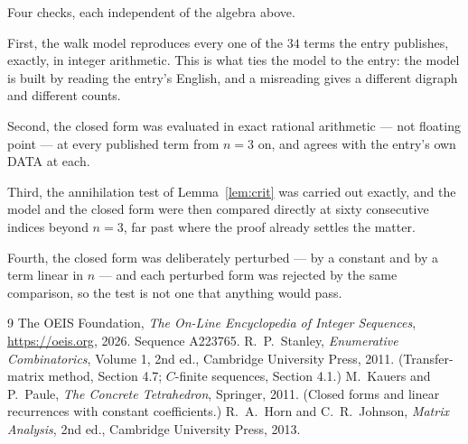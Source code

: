\documentclass[11pt,a4paper]{article}
\theoremstyle{plain}
\theoremstyle{definition}
\begin{document}
Four checks, each independent of the algebra above.

First, the walk model reproduces every one of the $34$ terms the entry publishes,
exactly, in integer arithmetic. This is what ties the model to the entry: the model is built
by reading the entry's English, and a misreading gives a different digraph and different
counts.

Second, the closed form was evaluated in exact rational arithmetic --- not floating point ---
at every published term from $n=3$ on, and agrees with the entry's own DATA at each.

Third, the annihilation test of Lemma~\ref{lem:crit} was carried out exactly, and the model
and the closed form were then compared directly at sixty consecutive indices beyond
$n=3$, far past where the proof already settles the matter.

Fourth, the closed form was deliberately perturbed --- by a constant and by a term linear in
$n$ --- and each perturbed form was rejected by the same comparison, so the test is not one
that anything would pass.

\begin{thebibliography}{9}
 The OEIS Foundation, \emph{The On-Line Encyclopedia of Integer
Sequences}, \url{https://oeis.org}, 2026. Sequence A223765.
 R.~P.~Stanley, \emph{Enumerative Combinatorics}, Volume 1, 2nd ed.,
Cambridge University Press, 2011. (Transfer-matrix method, Section 4.7; $C$-finite sequences,
Section 4.1.)
 M.~Kauers and P.~Paule, \emph{The Concrete Tetrahedron}, Springer, 2011.
(Closed forms and linear recurrences with constant coefficients.)
 R.~A.~Horn and C.~R.~Johnson, \emph{Matrix Analysis}, 2nd ed., Cambridge
University Press, 2013.
\end{thebibliography}
\end{document}
